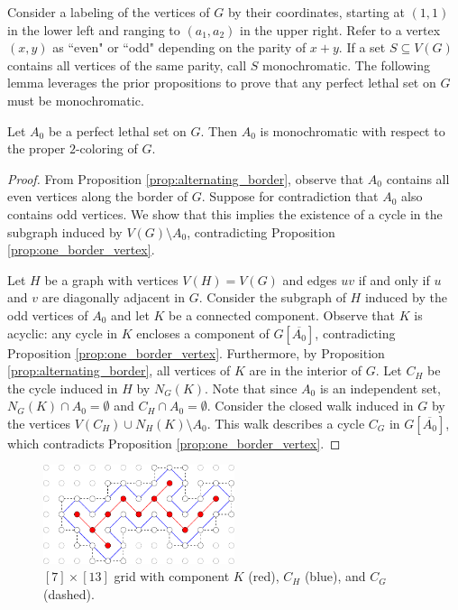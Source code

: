 Consider a labeling of the vertices of $G$ by their coordinates, starting at $(1,1)$ in the lower left and ranging to $(a_1,a_2)$ in the upper right. Refer to a vertex $(x,y)$ as ``even" or ``odd" depending on the parity of $x+y$. If a set $S \subseteq V(G)$ contains all vertices of the same parity, call $S$ monochromatic. The following lemma leverages the prior propositions to prove that any perfect lethal set on $G$ must be monochromatic.

\begin{lem}
Let $A_0$ be a perfect lethal set on $G$. Then $A_0$ is monochromatic with respect to the proper $2$-coloring of $G$.
\end{lem}

\begin{proof}
From Proposition \ref{prop:alternating_border}, observe that $A_0$ contains all even vertices along the border of $G$. Suppose for contradiction that $A_0$ also contains odd vertices. We show that this implies the existence of a cycle in the subgraph induced by $V(G) \setminus A_0$, contradicting Proposition \ref{prop:one_border_vertex}. 

Let $H$ be a graph with vertices $V(H) = V(G)$ and edges $uv$ if and only if $u$ and $v$ are diagonally adjacent in $G$. Consider the subgraph of $H$ induced by the odd vertices of $A_0$ and let $K$ be a connected component. Observe that $K$ is acyclic: any cycle in $K$ encloses a component of $G[\overline{A_0}]$, contradicting Proposition \ref{prop:one_border_vertex}. Furthermore, by Proposition \ref{prop:alternating_border}, all vertices of $K$ are in the interior of $G$. Let $C_H$ be the cycle induced in $H$ by $N_G(K)$. Note that since $A_0$ is an independent set, $N_G(K) \cap A_0 = \emptyset$ and $C_H \cap A_0 = \emptyset$. Consider the closed walk induced in $G$ by the vertices $V(C_H) \cup N_H(K) \setminus A_0$. This walk describes a cycle $C_G$ in $G[\overline{A_0}]$, which contradicts Proposition \ref{prop:one_border_vertex}.
 \end{proof}

\begin{figure}[]
\centering
\includegraphics[width=0.5\textwidth]{figures/6/monochromatic.pdf}
\caption{$[7] \times [13]$ grid with component $K$ (red), $C_H$ (blue), and $C_G$ (dashed).}
\label{fig:border}
\end{figure} 

